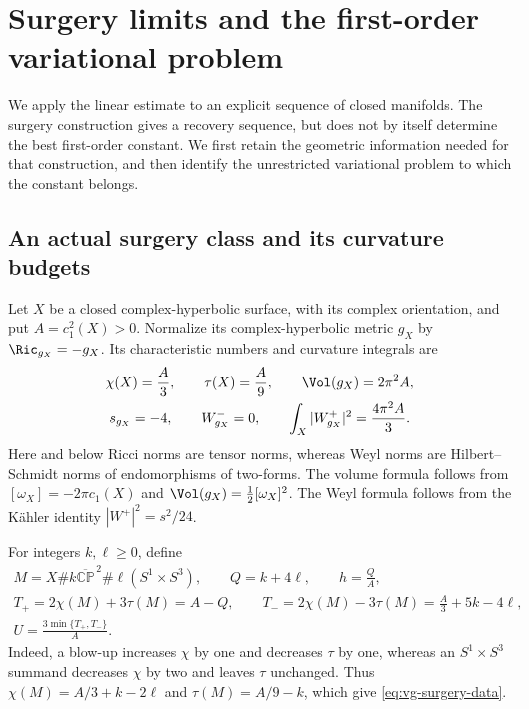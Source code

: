 \section{Surgery limits and the first-order variational problem}\label{sec:variational-geometry}

We apply the linear estimate to an explicit sequence of closed manifolds.
The surgery construction gives a recovery sequence, but does not by itself
determine the best first-order constant.  We first retain the geometric
information needed for that construction, and then identify the unrestricted
variational problem to which the constant belongs.

\subsection{An actual surgery class and its curvature budgets}

Let $X$ be a closed complex-hyperbolic surface, with its complex orientation,
and put $A=c_1^2(X)>0$.  Normalize its complex-hyperbolic metric $g_X$ by
$\Ric_{g_X}=-g_X$.  Its characteristic numbers and curvature integrals are
\begin{equation}\label{eq:vg-background}
 \begin{gathered}
 \chi(X)=\frac A3,\qquad \tau(X)=\frac A9,\qquad
 \Vol(g_X)=2\pi^2A,\\
 s_{g_X}=-4,\qquad W^-_{g_X}=0,
 \qquad \int_X|W^+_{g_X}|^2=\frac{4\pi^2A}{3}.
 \end{gathered}
\end{equation}
Here and below Ricci norms are tensor norms, whereas Weyl norms are
Hilbert--Schmidt norms of endomorphisms of two-forms.  The volume formula
follows from $[\omega_X]=-2\pi c_1(X)$ and
$\Vol(g_X)=\frac12[\omega_X]^2$.  The Weyl formula follows from the
K\"ahler identity $|W^+|^2=s^2/24$.

For integers $k,\ell\geq0$, define
\begin{equation}\label{eq:vg-surgery-data}
 \begin{gathered}
 M=X\#k\overline{\mathbb{CP}}^{\,2}\#\ell(S^1\times S^3),
 \qquad Q=k+4\ell,\qquad h=\frac QA,\\
 T_+=2\chi(M)+3\tau(M)=A-Q,\qquad
 T_-=2\chi(M)-3\tau(M)=\frac A3+5k-4\ell,\\
 U=\frac{3\min\{T_+,T_-\}}A.
 \end{gathered}
\end{equation}
Indeed, a blow-up increases $\chi$ by one and decreases $\tau$ by one,
whereas an $S^1\times S^3$ summand decreases $\chi$ by two and leaves
$\tau$ unchanged.  Thus
$\chi(M)=A/3+k-2\ell$ and $\tau(M)=A/9-k$, which give
\eqref{eq:vg-surgery-data}.

